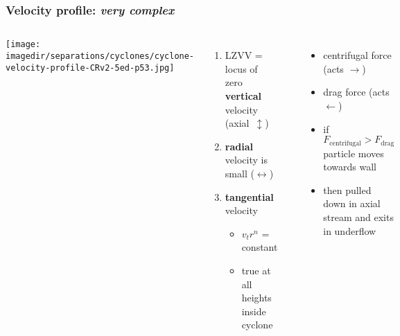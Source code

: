 \begin{frame}\frametitle{Velocity profile: \emph{very complex}}
	\begin{columns}[c]
			\begin{center}
				\texttt{[image: \\imagedir/separations/cyclones/cyclone-velocity-profile-CRv2-5ed-p53.jpg]}
			\end{center}
			{}
			\begin{enumerate}
				\item	LZVV = locus of zero \textbf{vertical} velocity (axial~$\updownarrow$)
				\item	\textbf{radial} velocity is small ($\longleftrightarrow$)
				\item	\textbf{tangential} velocity
					\begin{itemize}
						\item	$v_t r^n$ = constant
						\item	true at all heights inside cyclone
					\end{itemize}
			\end{enumerate}
			\hrule
			\begin{itemize}
				\item	centrifugal force (acts $\longrightarrow$)
				\item	drag force (acts $\longleftarrow$)
				\item	if $F_\text{centrifugal} > F_\text{drag}$\\ particle moves towards wall
				\item	then pulled down in axial stream and exits in underflow
			\end{itemize}
	\end{columns}
\end{frame}

